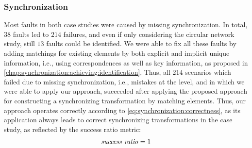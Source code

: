 


\subsubsection{Synchronization}

Most faults in both case studies were caused by missing synchronization.
In total, $38$ faults led to $214$ failures, and even if only considering the circular network study, still $13$ faults could be identified.
We were able to fix all these faults by adding matchings for existing elements by both explicit and implicit unique information, i.e., using correspondences as well as key information, as proposed in \autoref{chap:synchronization:achieving:identification}.
Thus, all $214$ scenarios which failed due to missing synchronization, i.e., mistakes at the \leveltransformation level, and in which we were able to apply our approach, succeeded after applying the proposed approach for constructing a synchronizing transformation by matching elements.
Thus, our approach operates correctly according to \autoref{eq:synchronization:correctness}, as its application always leads to correct synchronizing transformations in the case study, as reflected by the success ratio metric:
\begin{align*}
    \mathit{success\ ratio} = 1
\end{align*}

